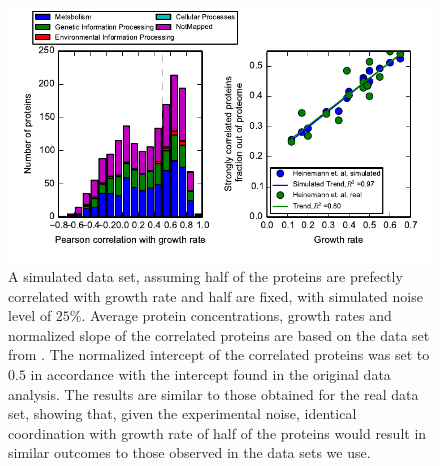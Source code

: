 \documentclass[a4paper]{article}
\begin{document}
\begin{figure}[H]
\begin{center}
\includegraphics[width=1\columnwidth]{SimulatedsummaryHistAndGr.pdf}
\caption{\label{fig:simulated}
A simulated data set, assuming half of the proteins are prefectly correlated with growth rate and half are fixed, with simulated noise level of $25\%$.
Average protein concentrations, growth rates and normalized slope of the correlated proteins are based on the data set from \cite{Heinemann2015}.
The normalized intercept of the correlated proteins was set to $0.5$ in accordance with the intercept found in the original data analysis.
The results are similar to those obtained for the real data set, showing that, given the experimental noise, identical coordination with growth rate of half of the proteins would result in similar outcomes to those observed in the data sets we use.%
}
\end{center}
\end{figure}
\end{document}
